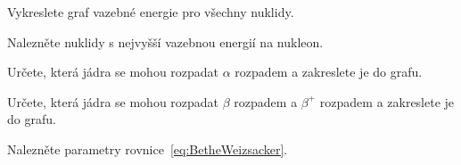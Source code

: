 \documentclass[a4paper,12pt,oneside]{article}
\theoremstyle{red}
\begin{document}
    \begin{task}
        Vykreslete graf vazebné energie pro všechny nuklidy.
    \end{task}

    \begin{task}
        Nalezněte nuklidy s nejvyšší vazebnou energií na nukleon.
    \end{task}

    \begin{task}
        Určete, která jádra se mohou rozpadat $\alpha$ rozpadem a zakreslete je do grafu.
    \end{task}

    \begin{task}
        Určete, která jádra se mohou rozpadat $\beta$ rozpadem a $\beta^{+}$ rozpadem a zakreslete je do grafu.
    \end{task}

    \begin{task}
        Nalezněte parametry rovnice~\eqref{eq:BetheWeizsacker}.
    \end{task}
\end{document}
